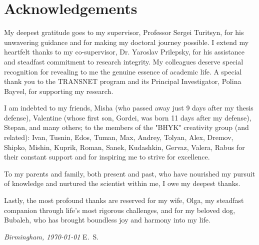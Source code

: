 \chapter*{Acknowledgements}

My deepest gratitude goes to my supervisor, Professor Sergei Turitsyn, for his unwavering guidance and for making my doctoral journey possible. I extend my heartfelt thanks to my co-supervisor, Dr. Yaroslav Prilepsky, for his assistance and steadfast commitment to research integrity.
My colleagues deserve special recognition for revealing to me the genuine essence of academic life. A special thank you to the TRANSNET program and its Principal Investigator, Polina Bayvel, for supporting my research.

I am indebted to my friends, Misha (who passed away just 9 days after my thesis defense), Valentine (whose first son, Gordei, was born 11 days after my defense), Stepan, and many others; to the members of the "BHYK" creativity group (and related): Ivan, Tusnin, Edos, Tuman, Max, Andrey, Tolyan, Alex, Dremov, Shipko, Mishin, Kuprik, Roman, Sanek, Kudashkin, Gervaz, Valera, Rabus for their constant support and for inspiring me to strive for excellence.

To my parents and family, both present and past, who have nourished my pursuit of knowledge and nurtured the scientist within me, I owe my deepest thanks.

Lastly, the most profound thanks are reserved for my wife, Olga, my steadfast companion through life's most rigorous challenges, and for my beloved dog, Bubaleh, who has brought boundless joy and harmony into my life.


\bigskip
 
\noindent\textit{Birmingham, \today}
\hfill E.~S.
